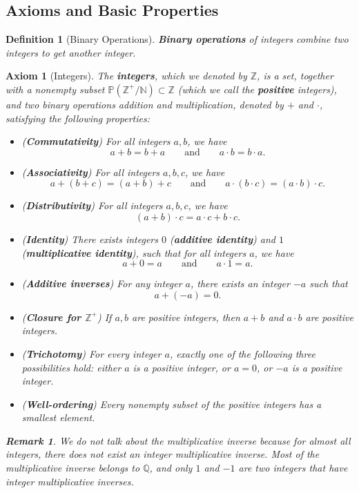 \documentclass[12pt,a4paper]{article}
\newtheorem{ax}{Axiom}[section]
\newtheorem{df}{Definition}[subsection]
\newtheorem*{rmk}{\indent Remark}
\def\Z{{\mathbb{Z}}}
\def\Q{{\mathbb{Q}}}
\def\N{{\mathbb{N}}}
\def\Zp{{\Z^{+}}}
\begin{document}
\subsection{Axioms and Basic Properties}
\begin{df}[Binary Operations]
	\textbf{Binary operations} of integers combine two integers to get another integer.	
\end{df}
\begin{ax}[Integers]
	The \textbf{integers}, which we denoted by $\Z$, is a set, together with a nonempty subset $\mathbb{P}(\Zp/\N)\subset \Z$ (which we call the \textbf{positive} integers), and two binary operations addition and multiplication, denoted by $+$ and $\cdot$, satisfying the following properties: 
	\begin{itemize}
		\item (\textbf{Commutativity}) For all integers $a,b$, we have \[a+b=b+a\qquad\text{and}\qquad a\cdot b=b\cdot a.\]
		\item (\textbf{Associativity}) For all integers $a,b,c$, we have \[a+(b+c)=(a+b)+c\qquad\text{and}\qquad a\cdot(b\cdot c)=(a\cdot b)\cdot c.\]
		\item (\textbf{Distributivity}) For all integers $a,b,c$, we have \[(a+b)\cdot c=a\cdot c+b\cdot c.\]
		\item (\textbf{Identity}) There exists integers $0$ (\textbf{additive identity}) and $1$ (\textbf{multiplicative identity}), such that for all integers $a$, we have \[a+0=a\qquad\text{and}\qquad a\cdot1=a.\]
		\item (\textbf{Additive inverses}) For any integer $a$, there exists an integer $-a$ such that \[a+(-a)=0.\]
		\item (\textbf{Closure for $\Zp$}) If $a,b$ are positive integers, then $a+b$ and $a\cdot b$ are positive integers.
		\item (\textbf{Trichotomy}) For every integer $a$, exactly one of the following three possibilities hold: either $a$ is a positive integer, or $a=0$, or $-a$ is a positive integer. 
		\item (\textbf{Well-ordering}) Every nonempty subset of the positive integers has a smallest element. 
	\end{itemize}
	\begin{rmk} We do not talk about the multiplicative inverse because for almost all integers, there does not exist an integer multiplicative inverse. Most of the multiplicative inverse belongs to $\Q$, and only $1$ and $-1$ are two integers that have integer multiplicative inverses. \end{rmk}
\end{ax}
\end{document}
